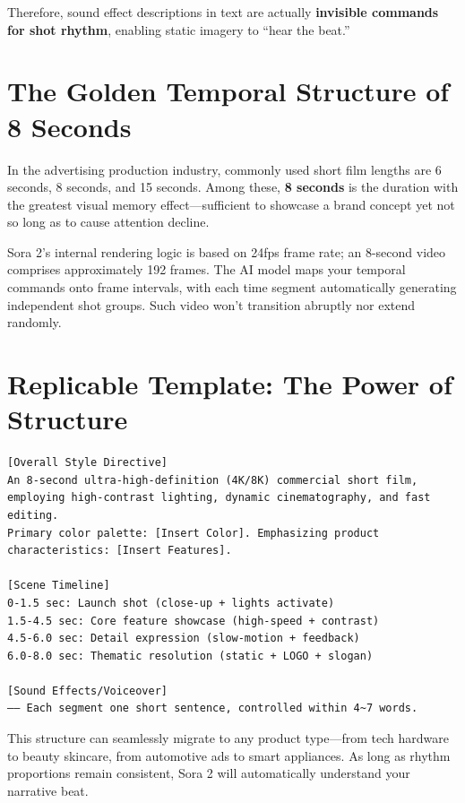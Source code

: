 Therefore, sound effect descriptions in text are actually \textbf{invisible commands for shot rhythm}, enabling static imagery to ``hear the beat.''

\section{The Golden Temporal Structure of 8 Seconds}
\label{sec:eight-second-structure}

In the advertising production industry, commonly used short film lengths are 6 seconds, 8 seconds, and 15 seconds. Among these, \textbf{8 seconds} is the duration with the greatest visual memory effect—sufficient to showcase a brand concept yet not so long as to cause attention decline.

Sora 2's internal rendering logic is based on 24fps frame rate; an 8-second video comprises approximately 192 frames. The AI model maps your temporal commands onto frame intervals, with each time segment automatically generating independent shot groups. Such video won't transition abruptly nor extend randomly.

\section{Replicable Template: The Power of Structure}
\label{sec:replicable-template}

\begin{verbatim}
[Overall Style Directive]
An 8-second ultra-high-definition (4K/8K) commercial short film,
employing high-contrast lighting, dynamic cinematography, and fast editing.
Primary color palette: [Insert Color]. Emphasizing product characteristics: [Insert Features].

[Scene Timeline]
0-1.5 sec: Launch shot (close-up + lights activate)
1.5-4.5 sec: Core feature showcase (high-speed + contrast)
4.5-6.0 sec: Detail expression (slow-motion + feedback)
6.0-8.0 sec: Thematic resolution (static + LOGO + slogan)

[Sound Effects/Voiceover]
—— Each segment one short sentence, controlled within 4~7 words.
\end{verbatim}

This structure can seamlessly migrate to any product type—from tech hardware to beauty skincare, from automotive ads to smart appliances. As long as rhythm proportions remain consistent, Sora 2 will automatically understand your narrative beat.

